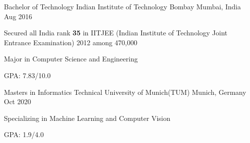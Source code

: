 
\begin{cventries}
  	
  	\cventry
    {Bachelor of Technology} %
    {Indian Institute of Technology Bombay} %
    {Mumbai, India} %
    {Aug 2016} %
    {
		\begin{cvitems}
			\item {Secured all India rank \textbf{35} in IITJEE (Indian Institute of Technology Joint Entrance Examination) 2012 among 470,000}
			\item {Major in Computer Science and Engineering}
			\item {GPA: 7.83/10.0}
		\end{cvitems}
    }
	
	\cventry
	{Masters in Informatics} %
	{Technical University of Munich(TUM)} %
	{Munich, Germany} %
	{Oct 2020} %
	{
		\begin{cvitems}
			\item {Specializing in Machine Learning and Computer Vision}
			\item {GPA: 1.9/4.0}
		\end{cvitems}
	}

\end{cventries}
